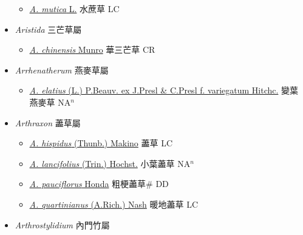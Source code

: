 \begin{itemize}
  \begin{itemize}
        \item[] \href{http://www.theplantlist.org/tpl1.1/search?q=Apluda+mutica}{\textit{A. mutica} L.}   水蔗草 LC
  \end{itemize}
 \item[] \textit{Aristida} 三芒草屬
                    
  \begin{itemize}
        \item[] \href{http://www.theplantlist.org/tpl1.1/search?q=Aristida+chinensis}{\textit{A. chinensis} Munro}   華三芒草 CR
  \end{itemize}
 \item[] \textit{Arrhenatherum} 燕麥草屬
                    
  \begin{itemize}
        \item[] \href{http://www.theplantlist.org/tpl1.1/search?q=Arrhenatherum+elatius}{\textit{A. elatius} (L.) P.Beauv. ex J.Presl \& C.Presl f. variegatum Hitchc.}   變葉燕麥草 NA$^n$
  \end{itemize}
 \item[] \textit{Arthraxon} 藎草屬
                    
  \begin{itemize}
        \item[] \href{http://www.theplantlist.org/tpl1.1/search?q=Arthraxon+hispidus}{\textit{A. hispidus} (Thunb.) Makino}   藎草 LC
        \item[] \href{http://www.theplantlist.org/tpl1.1/search?q=Arthraxon+lancifolius}{\textit{A. lancifolius} (Trin.) Hochst.}   小葉藎草 NA$^n$
        \item[] \href{http://www.theplantlist.org/tpl1.1/search?q=Arthraxon+pauciflorus}{\textit{A. pauciflorus} Honda}   粗梗藎草\# DD
        \item[] \href{http://www.theplantlist.org/tpl1.1/search?q=Arthraxon+quartinianus}{\textit{A. quartinianus} (A.Rich.) Nash}   暖地藎草 LC
  \end{itemize}
 \item[] \textit{Arthrostylidium} 內門竹屬
                    

\end{itemize}
